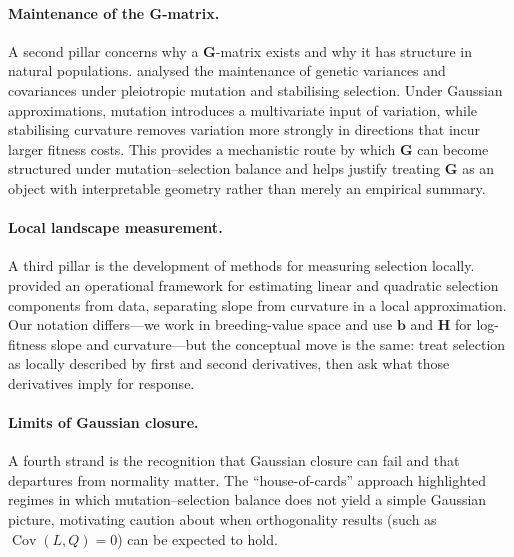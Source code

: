 \documentclass[9pt,twocolumn,twoside,lineno]{gsajnl}
\newcommand{\vect}[1]{\boldsymbol{#1}}
\newcommand{\mat}[1]{\mathbf{#1}}
\newcommand{\Cov}{\ensuremath{\operatorname{Cov}}\xspace}
\begin{document}
\paragraph{Maintenance of the G-matrix.}
A second pillar concerns why a $\mat{G}$-matrix exists and why it has structure in natural populations. \citet{Lande1980} analysed the maintenance of genetic variances and covariances under pleiotropic mutation and stabilising selection. Under Gaussian approximations, mutation introduces a multivariate input of variation, while stabilising curvature removes variation more strongly in directions that incur larger fitness costs. This provides a mechanistic route by which $\mat{G}$ can become structured under mutation--selection balance and helps justify treating $\mat{G}$ as an object with interpretable geometry rather than merely an empirical summary.

\paragraph{Local landscape measurement.}
A third pillar is the development of methods for measuring selection locally. \citet{LandeArnold1983} provided an operational framework for estimating linear and quadratic selection components from data, separating slope from curvature in a local approximation. Our notation differs---we work in breeding-value space and use $\vect{b}$ and $\mat{H}$ for log-fitness slope and curvature---but the conceptual move is the same: treat selection as locally described by first and second derivatives, then ask what those derivatives imply for response.

\paragraph{Limits of Gaussian closure.}
A fourth strand is the recognition that Gaussian closure can fail and that departures from normality matter. The ``house-of-cards'' approach \citep{Turelli1984} highlighted regimes in which mutation--selection balance does not yield a simple Gaussian picture, motivating caution about when orthogonality results (such as $\Cov(L,Q)=0$) can be expected to hold.
\end{document}
